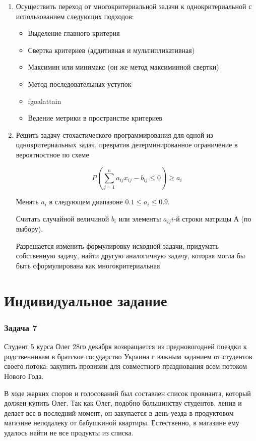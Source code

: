 \documentclass[14pt,a4paper,report]{report}
\begin{document}
\begin{enumerate}
    \item Осуществить переход от многокритериальной задачи к однокритериальной с использованием следующих подходов:
    
\begin{itemize}
 \item Выделение главного критерия
 \item Свертка критериев (аддитивная и мультипликативная)
 \item Максимин или минимакс (он же метод максиминной свертки)
 \item Метод последовательных уступок
 \item fgoalattain
 \item Ведение метрики в пространстве критериев
\end{itemize}

    \item  Решить задачу стохастического программирования для одной из однокритериальных задач, превратив детерминированное ограничение в вероятностное по схеме
   
   $$ P(\sum_{j=1}^n a_{ij}x_{ij} - b_{ij} \leq 0) \geq a_i$$
   
Менять  $ a_i $  в следующем диапазоне $ 0.1 \leq a_i \leq 0.9 $.

Считать случайной величиной $b_i$  или элементы   $ {a_{ij}}i$-й строки матрицы  А  (по выбору).

Разрешается изменить формулировку исходной задачи, придумать собственную задачу, найти другую аналогичную задачу, которая могла бы быть сформулирована как многокритериальная.
\end{enumerate}

\section{Индивидуальное задание}

\subsubsection{Задача 7}

Студент 5 курса Олег 28го декабря возвращается из предновогодней поездки к родственникам в братское государство Украина с важным заданием от студентов своего потока: закупить провизии для совместного празднования всем потоком Нового Года.

В ходе жарких споров и голосований был составлен список провианта, который должен купить Олег. Так как Олег, подобно большинству студентов, ленив и делает все в последний момент, он закупается в день уезда в продуктовом магазине неподалеку от бабушкиной квартиры. Естественно, в магазине ему удалось найти не все продукты из списка.
\end{document}

